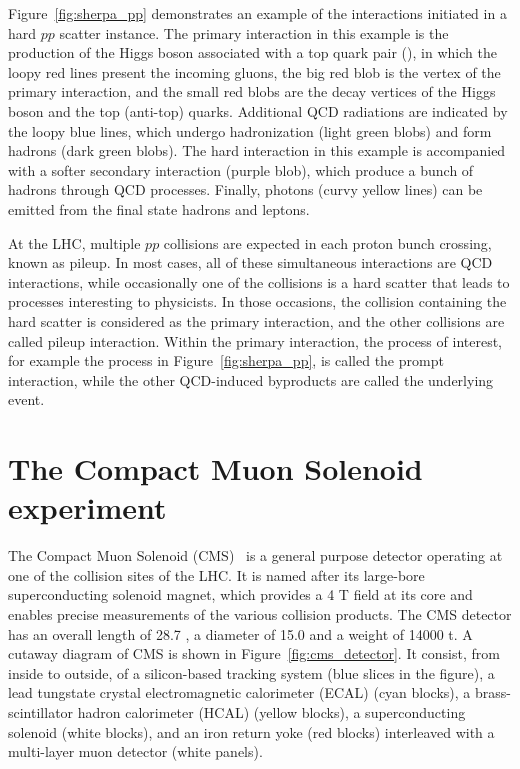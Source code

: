Figure~\ref{fig:sherpa_pp} demonstrates an example of the interactions initiated in a hard $pp$ scatter instance.
The primary interaction in this example is the production of the Higgs boson associated with a top quark pair (\ttH),
in which the loopy red lines present the incoming gluons, the big red blob is the vertex of the primary interaction,
and the small red blobs are the decay vertices of the Higgs boson and the top (anti-top) quarks.
Additional QCD radiations are indicated by the loopy blue lines, which undergo hadronization (light green blobs) and form hadrons (dark green blobs). 
The hard interaction in this example is accompanied with a softer secondary interaction (purple blob), 
which produce a bunch of hadrons through QCD processes.
Finally, photons (curvy yellow lines) can be emitted from the final state hadrons and leptons.

At the LHC, multiple $pp$ collisions are expected in each proton bunch crossing, known as pileup.
In most cases, all of these simultaneous interactions are QCD interactions, 
while occasionally one of the collisions is a hard scatter that leads to processes interesting to physicists.
In those occasions, the collision containing the hard scatter is considered as the primary interaction, 
and the other collisions are called pileup interaction.
Within the primary interaction, the process of interest, for example the \ttH process in Figure~\ref{fig:sherpa_pp},
is called the prompt interaction, while the other QCD-induced byproducts are called the underlying event.

\section{The Compact Muon Solenoid experiment}\label{sec:cms}


The Compact Muon Solenoid (CMS)~\cite{Collaboration_2008} is a general purpose detector operating at one of the collision sites of the LHC.
It is named after its large-bore superconducting solenoid magnet, 
which provides a 4 T field at its core and enables precise measurements of the various collision products.
The CMS detector has an overall length of 28.7 \meter, a diameter of 15.0 \meter and a weight of 14000 t.
A cutaway diagram of CMS is shown in Figure~\ref{fig:cms_detector}.
It consist, from inside to outside, of a silicon-based tracking system (blue slices in the figure), 
a lead tungstate crystal electromagnetic calorimeter (ECAL) (cyan blocks),
a brass-scintillator hadron calorimeter (HCAL) (yellow blocks),
a superconducting solenoid (white blocks), 
and an iron return yoke (red blocks) interleaved with a multi-layer muon detector (white panels).

